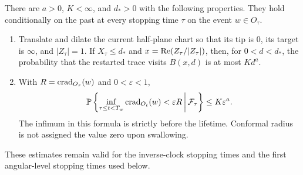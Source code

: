 \begin{lemma}\label{eng:restarts}
There are $a>0$, $K<\infty$, and $d_*>0$ with the following properties.
They hold conditionally on the past at every stopping time $\tau$ on the
event $w\in O_\tau$.
\begin{enumerate}
\item Translate and dilate the current half-plane chart so that its tip
is $0$, its target is $\infty$, and $|Z_\tau|=1$.  If
$X_\tau\le d_*$ and $x=\operatorname{Re}(Z_\tau/|Z_\tau|)$, then, for
$0<d<d_*$, the probability that the restarted trace visits $B(x,d)$ is at
most $Kd^a$.
\item With $R=\operatorname{crad}_{O_\tau}(w)$ and $0<\varepsilon<1$,
\begin{equation}\label{eng:bulk-crad}
 \mathbb P\left\{
   \inf_{\tau\le t<T_w}\operatorname{crad}_{O_t}(w)<\varepsilon R
      \,\middle|\,\mathcal F_\tau\right\}
 \le K\varepsilon^a.
\end{equation}
The infimum in this formula is strictly before the lifetime.  Conformal
radius is not assigned the value zero upon swallowing.
\end{enumerate}
These estimates remain valid for the inverse-clock stopping times and
the first angular-level stopping times used below.
\end{lemma}

